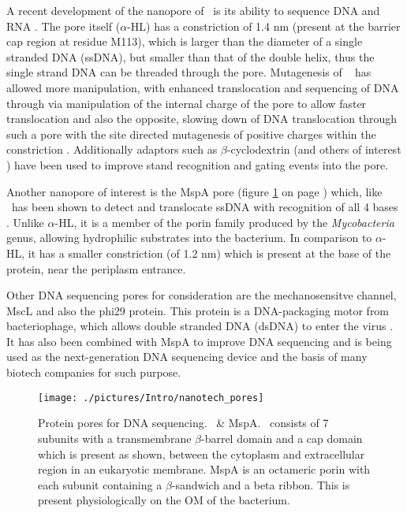A recent development of the nanopore of \ahl\ is its ability to sequence DNA \cite{Branton2008} and RNA \cite{Akeson1999}. The pore itself ($\alpha$-HL) has a constriction of 1.4 nm (present at the barrier cap region at residue M113), which is larger than the diameter of a single stranded DNA (ssDNA), but smaller than that of the double helix, thus the single strand DNA can be threaded through the pore. Mutagenesis of \ahl\ \cite{Bayley2004} has allowed more manipulation, with enhanced translocation and sequencing of DNA \cite{Clarke2009} through via manipulation of the internal charge of the pore \cite{Maglia2008} to allow faster translocation and also the opposite, slowing down of DNA translocation through such a pore with the site directed mutagenesis of positive charges within the constriction \cite{Rincon2011}. Additionally adaptors \cite{Gu1999} such as $\beta$-cyclodextrin (and others of interest \cite{Sanchez2000}) have been used to improve stand recognition and gating events into the pore. 

Another nanopore of interest is the MspA pore \cite{Butler2008} (figure \ref{fig:nanotech_pores} on page \pageref{fig:nanotech_pores}) which, like \ahl\ has been shown to detect and translocate ssDNA with recognition of all 4 bases \cite{Derrington2010}. Unlike $\alpha$-HL, it is a member of the porin family produced by the \textit{Mycobacteria} genus, allowing hydrophilic substrates into the bacterium.  In comparison to $\alpha$-HL, it has a smaller constriction (of 1.2 nm) which is present at the base of the protein, near the periplasm entrance.

Other DNA sequencing pores for consideration are the mechanosensitve channel, MscL \cite{Farimani2015} and also the phi29 protein. This protein is a DNA-packaging motor from bacteriophage, which allows double stranded DNA (dsDNA) to enter the virus \cite{Wendell2009,Geng2013b}. It has also been combined with MspA to improve DNA sequencing \cite{Manrao2012}and is being used as the next-generation DNA sequencing device \cite{Schneider2012,Feng2015} and the basis of many biotech companies for such purpose.

\begin{figure}[H]
\begin{center}
\texttt{[image: ./pictures/Intro/nanotech\_pores]}
\caption[Protein pores for DNA sequencing.] {Protein pores for DNA sequencing. \ahl\ \& MspA. \ahl\ consists of 7 subunits with a transmembrane $\beta$-barrel domain and a cap domain which is present as shown, between the cytoplasm and extracellular region in an eukaryotic membrane. MspA is an octameric porin with each subunit containing a $\beta$-sandwich and a beta ribbon. This is present physiologically on the OM of the bacterium.}
\label{fig:nanotech_pores}
\end{center}
\end{figure}

